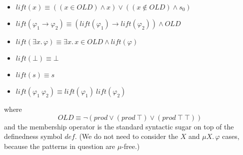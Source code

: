 \documentclass{article}
\begin{document}
\begin{definition}
\begin{enumerate}
\begin{itemize}
        \item $\mathit{lift}(x) \equiv ((x \in \mathit{OLD}) \land x) \lor ((x \not\in \mathit{OLD}) \land s_0)$
        \item $\mathit{lift}(\varphi_1 \rightarrow \varphi_2) \equiv (\mathit{lift}(\varphi_1) \rightarrow \mathit{lift}(\varphi_2)) \land \mathit{OLD}$
        \item $\mathit{lift}(\exists x.\, \varphi) \equiv \exists x.\, x \in \mathit{OLD} \land \mathit{lift}(\varphi)$
        \item $\mathit{lift}(\bot) \equiv \bot$
        \item $\mathit{lift}(s) \equiv s$
        \item $\mathit{lift}(\varphi_1 \ \varphi_2) \equiv \mathit{lift}(\varphi_1) \ \mathit{lift}(\varphi_2)$
    \end{itemize}
    where
        \begin{equation*}
            \mathit{OLD} \equiv \neg (\mathit{prod} \lor (\mathit{prod}\ \top) \lor (\mathit{prod}\ \top\ \top))
        \end{equation*}
    and the membership operator is the standard syntactic sugar on top of the definedness symbol $\mathit{def}$.
    (We do not need to consider the $X$ and $\mu X.\, \varphi$ cases, because the patterns in question are $\mu$-free.)
\end{enumerate}
\end{definition}
\end{document}
